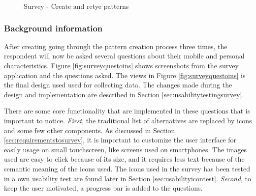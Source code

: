 \begin{figure}[H]
{        \label{fig:retypewrong}
      }
      \caption{Survey - Create and retye patterns}
      \label{fig:createandretypepatterns}
    \end{figure}

  \clearpage 

  \subsubsection*{Background information}
    After creating going through the pattern creation process three times, the respondent will now be asked several questions about their mobile and personal characteristics.
    Figure \ref{fig:surveyquestoins} shows screenshots from the survey application and the questions asked. The views in Figure \ref{fig:surveyquestoins} is the final design used used for collecting data. The changes made during the design and implementation are described in Section \ref{sec:usabilitytestingsurvey}. 

    There are some core functionality that are implemented in these questions that is important to notice. {\it First}, the traditional list of alternatives are replaced by icons and some few other components. As discussed in Section \ref{sec:requirementstosurvey}, it is important to customize the user interface for easily usage on small touchscreen, like screens used on smartphones. The images used are easy to click because of its size, and it requires less text because of the semantic meaning of the icons used. The icons used in the survey has been tested in a own usability test are found later in Section \ref{sec:usabilityicontest}. {\it Second}, to keep the user motivated, a progress bar is added to the questions. 
    

